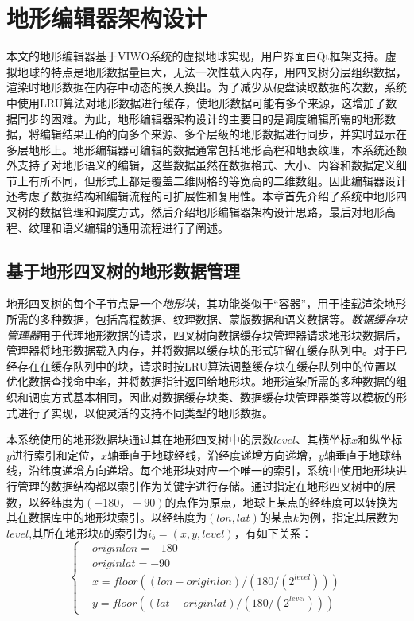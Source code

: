 
\chapter{地形编辑器架构设计}
本文的地形编辑器基于VIWO系统的虚拟地球实现，用户界面由Qt框架支持。虚拟地球的特点是地形数据量巨大，无法一次性载入内存，用四叉树分层组织数据，渲染时地形数据在内存中动态的换入换出。为了减少从硬盘读取数据的次数，系统中使用LRU算法对地形数据进行缓存，使地形数据可能有多个来源，这增加了数据同步的困难。为此，地形编辑器架构设计的主要目的是调度编辑所需的地形数据，将编辑结果正确的向多个来源、多个层级的地形数据进行同步，并实时显示在多层地形上。地形编辑器可编辑的数据通常包括地形高程和地表纹理，本系统还额外支持了对地形语义的编辑，这些数据虽然在数据格式、大小、内容和数据定义细节上有所不同，但形式上都是覆盖二维网格的等宽高的二维数组。因此编辑器设计还考虑了数据结构和编辑流程的可扩展性和复用性。本章首先介绍了系统中地形四叉树的数据管理和调度方式，然后介绍地形编辑器架构设计思路，最后对地形高程、纹理和语义编辑的通用流程进行了阐述。\par
\section{基于地形四叉树的地形数据管理}                       
地形四叉树的每个子节点是一个\textit{地形块}，其功能类似于“容器”，用于挂载渲染地形所需的多种数据，包括高程数据、纹理数据、蒙版数据和语义数据等。\textit{数据缓存块管理器}用于代理地形数据的请求，四叉树向数据缓存块管理器请求地形块数据后，管理器将地形数据载入内存，并将数据以缓存块的形式驻留在缓存队列中。对于已经存在在缓存队列中的块，请求时按LRU算法调整缓存块在缓存队列中的位置以优化数据查找命中率，并将数据指针返回给地形块。地形渲染所需的多种数据的组织和调度方式基本相同，因此对数据缓存块类、数据缓存块管理器类等以模板的形式进行了实现，以便灵活的支持不同类型的地形数据。\par

本系统使用的地形数据块通过其在地形四叉树中的层数$level$、其横坐标$x$和纵坐标$y$进行索引和定位，$x$轴垂直于地球经线，沿经度递增方向递增，$y$轴垂直于地球纬线，沿纬度递增方向递增。每个地形块对应一个唯一的索引，系统中使用地形块进行管理的数据结构都以索引作为关键字进行存储。通过指定在地形四叉树中的层数，以经纬度为$(-180，-90)$的点作为原点，地球上某点的经纬度可以转换为其在数据库中的地形块索引。以经纬度为$(lon,lat)$的某点$k$为例，指定其层数为$level$,其所在地形块$b$的索引为$i_b=(x,y,level)$，有如下关系：
\begin{equation}
\left\{ \begin{aligned}
&originlon=-180\\
&originlat=-90\\
&x=floor((lon-originlon)/(180/(2^{level})))\\
&y=floor((lat-originlat)/(180/(2^{level})))
\end{aligned}\right.
\end{equation}

